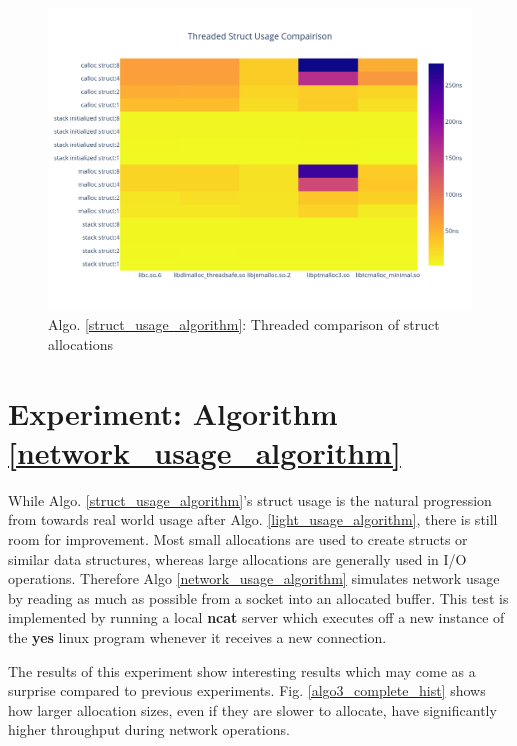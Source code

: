 \documentclass[letterpaper, 10 pt, conference]{ieeeconf}  %
\begin{document}
\begin{figure}[tbh!]
  \centering
  \includegraphics[width=\columnwidth]{graphs/struct_threaded_hist.png}
  \caption{ Algo. \ref{struct_usage_algorithm}: Threaded comparison of struct allocations }
  \label{algo2_complete_threaded_hist}
\end{figure}

\section{Experiment: Algorithm \ref{network_usage_algorithm}}

While Algo. \ref{struct_usage_algorithm}'s struct usage is the natural progression from towards real world usage after Algo. \ref{light_usage_algorithm}, there is still room for improvement.
Most small allocations are used to create structs or similar data structures, whereas large allocations are generally used in I/O operations.
Therefore Algo \ref{network_usage_algorithm} simulates network usage by reading as much as possible from a socket into an allocated buffer.
This test is implemented by running a local \textbf{ncat} server which executes off a new instance of the \textbf{yes} linux program whenever it receives a new connection.

The results of this experiment show interesting results which may come as a surprise compared to previous experiments.
Fig. \ref{algo3_complete_hist} shows how larger allocation sizes, even if they are slower to allocate, have significantly higher throughput during network operations.
\end{document}

